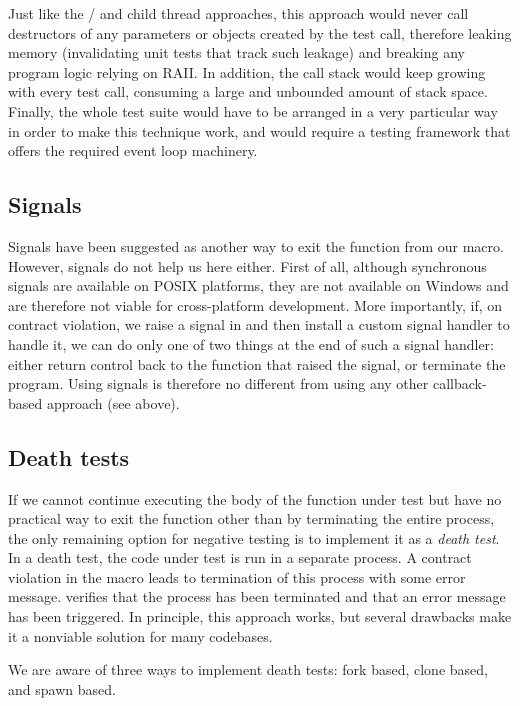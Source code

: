 Just like the / and child thread approaches, this approach would never call destructors of any parameters or objects created by the test call, therefore leaking memory (invalidating unit tests that track such leakage) and breaking any program logic relying on RAII. In addition, the call stack would keep growing with every test call, consuming a large and unbounded amount of stack space. Finally, the whole test suite would have to be arranged in a very particular way in order to make this technique work, and would require a testing framework that offers the required event loop machinery.

\subsection{Signals}

Signals have been suggested as another way to exit the function from our  macro. However, signals do not help us here either. First of all, although synchronous signals are available on POSIX platforms, they are not available on Windows and are therefore not viable for cross-platform development. More importantly, if, on contract violation, we raise a signal in  and then install a custom signal handler to handle it, we can do only one of two things at the end of such a signal handler: either return control back to the function that raised the signal, or terminate the program. Using signals is therefore no different from using any other callback-based approach (see above).

\subsection{Death tests}
\label{subsec:deathtests}

If we cannot continue executing the body of the function under test but have no practical way to exit the function other than by terminating the entire process, the only remaining option for negative testing is to implement it as a \emph{death test}. In a death test, the code under test is run in a separate process. A contract violation in the  macro leads to termination of this process with some error message.  verifies that the process has been terminated and that an error message has been triggered. In principle, this approach works, but several drawbacks make it a nonviable solution for many codebases.

We are aware of three ways to implement death tests: fork based, clone based, and spawn based.

